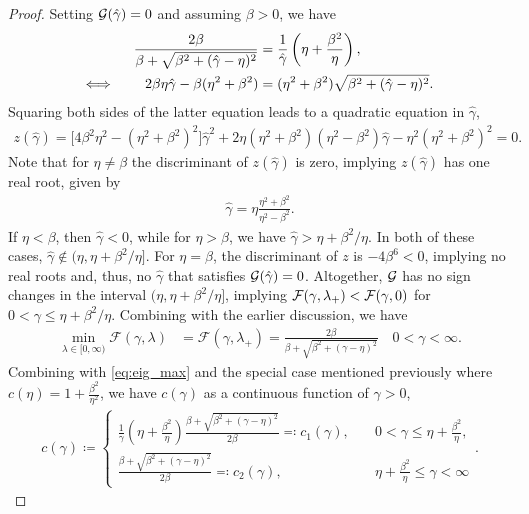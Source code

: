 \documentclass[review]{siamart}
\begin{document}
\begin{proof}
Setting ${\cal G}(\hat{\gamma}) = 0$ and assuming $\beta > 0$, we have
\begin{align}\nonumber
\frac{2\beta}{\beta + \sqrt{\beta^2 + (\hat{\gamma}-\eta)^2}} & =
	\frac{1}{\hat{\gamma}} \left(\eta + \frac{\beta^2}{\eta} \right), \\
\Longleftrightarrow \hspace{5ex} \label{eq:rhs_pf}
2\beta \eta \hat{\gamma} -\beta(\eta^2 + \beta^2)  & = 
	(\eta^2 + \beta^2) \sqrt{\beta^2 + (\hat{\gamma}-\eta)^2}. 
\end{align}
%
Squaring both sides of the latter equation leads to a quadratic equation in $\hat{\gamma}$, 
%
\begin{align*}
z(\hat{\gamma}) = \big[ 4 \beta^2 \eta^2 - (\eta^2 + \beta^2)^2 \big] \hat{\gamma}^2 + 2 \eta (\eta^2 + \beta^2)(\eta^2 - \beta^2) \hat{\gamma} - \eta^2(\eta^2 + \beta^2)^2 = 0.
\end{align*}
%
Note that for $\eta\neq\beta$ the discriminant of $z(\hat{\gamma})$ is zero, implying
$z(\hat{\gamma})$ has one real root, given by
%
\begin{align} \label{eq:gamma_hat}
\hat{\gamma} = \eta \frac{\eta^2 + \beta^2}{\eta^2 - \beta^2}. 
\end{align}
%
If $\eta < \beta$, then $\hat{\gamma} < 0$, while for $\eta > \beta$, we
have $\hat{\gamma} > \eta+\beta^2/\eta$. In both of these cases, $\hat{\gamma}
\not\in(\eta,\eta+\beta^2/\eta]$. For $\eta = \beta$, the discriminant of 
$z$ is $-4\beta^6 < 0$, implying no real roots and, thus, no $\hat{\gamma}$
that satisfies ${\cal G}(\hat{\gamma}) = 0$. Altogether, ${\cal G}$ has no
sign changes in the interval $(\eta,\eta+\beta^2/\eta]$, implying
${\cal F} (\gamma, \lambda_+) < {\cal F}(\gamma, 0)$ for $0 < \gamma
\leq \eta + \beta^2/\eta.$ Combining with the earlier discussion, we have
%
\begin{align*}
\min_{\lambda\in[0,\infty)} \mathcal{F}(\gamma,\lambda) &=
	\mathcal{F}(\gamma,\lambda_+) =
\frac{2\beta}{\beta + \sqrt{\beta^2 + (\gamma-\eta)^2}}
	\quad 0 < \gamma < \infty.
\end{align*}
%
Combining with \eqref{eq:eig_max} and the special case mentioned previously where
$c(\eta) = 1+\tfrac{\beta^2}{\eta^2}$, we have $c(\gamma)$ as a continuous
function of $\gamma>0$,
\begin{align}
\label{eq:condc}
c(\gamma) 
\coloneqq
\begin{cases}
\displaystyle
\frac{1}{\gamma} \left(\eta + \tfrac{\beta^2}{\eta} \right) \frac{\beta + \sqrt{\beta^2 + (\gamma-\eta)^2}}{2\beta}
\eqqcolon c_1(\gamma), 
\quad & 0 < \gamma \leq \eta + \tfrac{\beta^2}{\eta},
\\[3ex]
\displaystyle
\frac{\beta + \sqrt{\beta^2 + (\gamma-\eta)^2}}{2\beta}
\eqqcolon c_2(\gamma), 
\quad &\eta + \tfrac{\beta^2}{\eta} \leq \gamma < \infty 
\end{cases}.
\end{align}
%


\end{proof}
\end{document}
